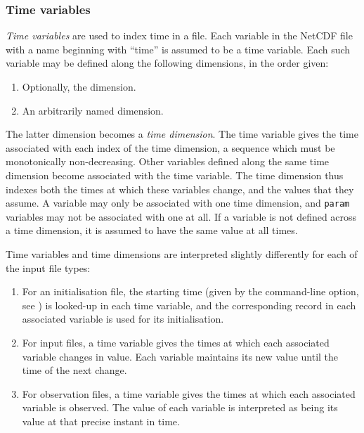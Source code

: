 \subsubsection{Time variables\label{Time_variables}}

\emph{Time variables} are used to index time in a file. Each variable in the
NetCDF file with a name beginning with ``time'' is assumed to be a time
variable. Each such variable may be defined along the following dimensions, in
the order given:
\begin{enumerate}
\item Optionally, the  dimension.
\item An arbitrarily named dimension.
\end{enumerate}
The latter dimension becomes a \emph{time
  dimension}. The time variable gives the time
associated with each index of the time dimension, a sequence which must be
monotonically non-decreasing. Other variables defined along the same time
dimension become associated with the time variable. The time dimension thus
indexes both the times at which these variables change, and the values that
they assume. A variable may only be associated with one time dimension, and
\texttt{param} variables may not be associated with one at all. If a variable
is not defined across a time dimension, it is assumed to have the same value
at all times.

Time variables and time dimensions are interpreted slightly differently for
each of the input file types:
\begin{enumerate}
\item For an initialisation file, the starting time (given by the 
  command-line option, see ) is looked-up in each time
  variable, and the corresponding record in each associated variable is used
  for its initialisation.
\item For input files, a time variable gives the times at which each
  associated variable changes in value. Each variable maintains its new
  value until the time of the next change.
\item For observation files, a time variable gives the times at which each
  associated variable is observed. The value of each variable is interpreted
  as being its value at that precise instant in time.
\end{enumerate}

